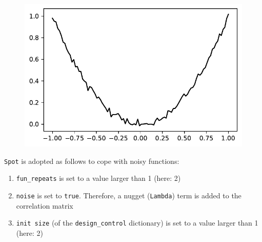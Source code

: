\documentclass[
  letterpaper,
  DIV=11,
  numbers=noendperiod]{scrreprt}
\providecommand{\tightlist}{%
  \setlength{\itemsep}{0pt}\setlength{\parskip}{0pt}}\usepackage{longtable,booktabs,array}
\begin{document}
\begin{figure}[H]

{\centering \includegraphics{013_num_spot_noisy_files/figure-pdf/cell-4-output-1.pdf}

}

\end{figure}

\texttt{Spot} is adopted as follows to cope with noisy functions:

\begin{enumerate}
\def\labelenumi{\arabic{enumi}.}
\tightlist
\item
  \texttt{fun\_repeats} is set to a value larger than 1 (here: 2)
\item
  \texttt{noise} is set to \texttt{true}. Therefore, a nugget
  (\texttt{Lambda}) term is added to the correlation matrix
\item
  \texttt{init\ size} (of the \texttt{design\_control} dictionary) is
  set to a value larger than 1 (here: 2)
\end{enumerate}
\end{document}
